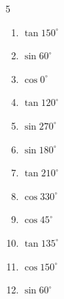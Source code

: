 \begin{multicols}{5}
\begin{enumerate}
        \phantom{$\displaystyle =0$}

\columnbreak %

  \item $\displaystyle \tan{150^\circ}$


  \item $\displaystyle \sin{60^\circ}$


  \item $\displaystyle \cos{0^\circ}$

        \phantom{$\displaystyle =1$}

  \item $\displaystyle \tan{120^\circ}$


  \item $\displaystyle \sin{270^\circ}$

        \phantom{$\displaystyle =-1$}

  \item $\displaystyle \sin{180^\circ}$

        \phantom{$\displaystyle =0$}

  \item $\displaystyle \tan{210^\circ}$


  \item $\displaystyle \cos{330^\circ}$


  \item $\displaystyle \cos{45^\circ}$


  \item $\displaystyle \tan{135^\circ}$

        \phantom{$\displaystyle =-1$}

  \item $\displaystyle \cos{150^\circ}$


  \item $\displaystyle \sin{60^\circ}$



\end{enumerate}
\end{multicols}
